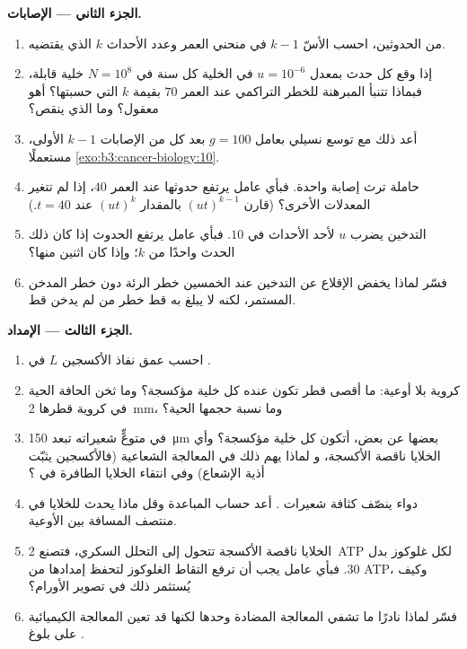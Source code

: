 \begin{problem}
\medskip
\noindent\textbf{الجزء الثاني --- الإصابات.}
\begin{enumerate}[resume]
  \item من الحدوثين، احسب الأسّ $k - 1$ في
        منحني العمر وعدد الأحداث $k$ الذي يقتضيه.
  \item إذا وقع كل حدث بمعدل $u = 10^{-6}$ في الخلية كل سنة في
        $N = 10^{8}$ خلية قابلة، فبماذا تتنبأ المبرهنة
        للخطر التراكمي عند العمر $70$ بقيمة $k$ التي حسبتها؟ أهو
        معقول؟ وما الذي ينقص؟
  \item أعد ذلك مع توسع نسيلي بعامل $g = 100$ بعد كل
        من الإصابات $k - 1$ الأولى، مستعملًا
        \cref{exo:b3:cancer-biology:10}.
  \item حاملة ترث إصابة واحدة. فبأي عامل يرتفع حدوثها عند
        العمر $40$، إذا لم تتغير المعدلات الأخرى؟ (قارن
        $(ut)^{k-1}$ بالمقدار $(ut)^{k}$ عند $t = 40$.)
  \item التدخين يضرب $u$ لأحد الأحداث في $10$. فبأي
        عامل يرتفع الحدوث إذا كان ذلك الحدث واحدًا من $k$؛
        وإذا كان اثنين منها؟
  \item فسّر لماذا يخفض الإقلاع عن التدخين عند الخمسين خطر 
        الرئة دون خطر المدخن المستمر، لكنه لا يبلغ به قط خطر
        من لم يدخن قط.
\end{enumerate}

\medskip
\noindent\textbf{الجزء الثالث --- الإمداد.}
\begin{enumerate}[resume]
  \item احسب عمق نفاذ الأكسجين $L$ في .
  \item كروية بلا أوعية: ما أقصى قطر تكون عنده كل
        خلية مؤكسجة؟ وما ثخن الحافة الحية
        في كروية قطرها \qty{2}{mm}، وما نسبة حجمها
        الحية؟
  \item في  متوعٍّ شعيراته تبعد \qty{150}{\micro m}
        بعضها عن بعض، أتكون كل خلية مؤكسجة؟ وأي الخلايا ناقصة الأكسجة، و
        لماذا يهم ذلك في المعالجة الشعاعية (فالأكسجين يثبّت أذية الإشعاع)
        وفي انتقاء الخلايا الطافرة في ؟
  \item دواء ينصّف كثافة شعيرات . أعد حساب
        المباعدة وقل ماذا يحدث للخلايا في منتصف المسافة بين
        الأوعية.
  \item الخلايا ناقصة الأكسجة تتحول إلى التحلل السكري، فتصنع \qty{2}{ATP} لكل
        غلوكوز بدل $30$. فبأي عامل يجب أن ترفع التقاط
        الغلوكوز لتحفظ إمدادها من ATP، وكيف يُستثمر ذلك في
        تصوير الأورام؟
  \item فسّر لماذا نادرًا ما تشفي المعالجة المضادة  وحدها لكنها
        قد تعين المعالجة الكيميائية على بلوغ .
\end{enumerate}


\end{problem}
